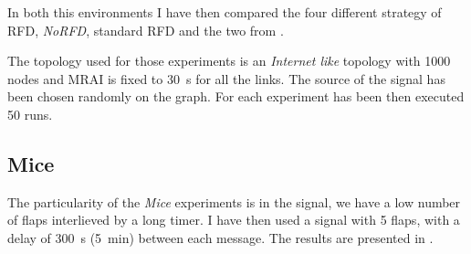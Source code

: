 In both this environments I have then compared the four different strategy of
\ac{RFD}, \textit{NoRFD}, standard \ac{RFD} and the two from \cite{rfc7196}.

The topology used for those experiments is an \textit{Internet like} topology
with \num{1000} nodes and \ac{MRAI} is fixed to \SI{30}{\second} for all the links.
The source of the signal has been chosen randomly on the graph.
For each experiment has been then executed \num{50} runs.

\subsection{Mice}
\label{subsec:mice}

The particularity of the \textit{Mice} experiments is in the signal, we have
a low number of flaps interlieved by a long timer.
I have then used a signal with \num{5} flaps,  with a delay
of \SI{300}{\second} (\SI{5}{\minute}) between each message.
The results are presented in .

